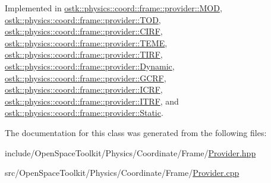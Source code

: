 Implemented in \hyperlink{classostk_1_1physics_1_1coord_1_1frame_1_1provider_1_1_m_o_d_a0b6a40a222857ad032f5d5a8d228ab16}{ostk\+::physics\+::coord\+::frame\+::provider\+::\+M\+OD}, \hyperlink{classostk_1_1physics_1_1coord_1_1frame_1_1provider_1_1_t_o_d_a57f8d993ac693b2cd39b4a99faadc92f}{ostk\+::physics\+::coord\+::frame\+::provider\+::\+T\+OD}, \hyperlink{classostk_1_1physics_1_1coord_1_1frame_1_1provider_1_1_c_i_r_f_affec3924a864a0d793ee5aa887a06cf8}{ostk\+::physics\+::coord\+::frame\+::provider\+::\+C\+I\+RF}, \hyperlink{classostk_1_1physics_1_1coord_1_1frame_1_1provider_1_1_t_e_m_e_a8a1c5599411f152c63b69819e89b0464}{ostk\+::physics\+::coord\+::frame\+::provider\+::\+T\+E\+ME}, \hyperlink{classostk_1_1physics_1_1coord_1_1frame_1_1provider_1_1_t_i_r_f_ac7f3d815a45e270adab07bf6f51dc25f}{ostk\+::physics\+::coord\+::frame\+::provider\+::\+T\+I\+RF}, \hyperlink{classostk_1_1physics_1_1coord_1_1frame_1_1provider_1_1_dynamic_ab01d8d9a09df8e46680eb1acb830a86c}{ostk\+::physics\+::coord\+::frame\+::provider\+::\+Dynamic}, \hyperlink{classostk_1_1physics_1_1coord_1_1frame_1_1provider_1_1_g_c_r_f_a02160b74124b3ece74912c62aae5caaa}{ostk\+::physics\+::coord\+::frame\+::provider\+::\+G\+C\+RF}, \hyperlink{classostk_1_1physics_1_1coord_1_1frame_1_1provider_1_1_i_c_r_f_a0d8e56478597e46dbc2c1867e6774398}{ostk\+::physics\+::coord\+::frame\+::provider\+::\+I\+C\+RF}, \hyperlink{classostk_1_1physics_1_1coord_1_1frame_1_1provider_1_1_i_t_r_f_a2f3a53b002d54f1adf829cefc2cf7393}{ostk\+::physics\+::coord\+::frame\+::provider\+::\+I\+T\+RF}, and \hyperlink{classostk_1_1physics_1_1coord_1_1frame_1_1provider_1_1_static_a5b7189d8cff8128fee348af2feac1304}{ostk\+::physics\+::coord\+::frame\+::provider\+::\+Static}.



The documentation for this class was generated from the following files\+:\begin{DoxyCompactItemize}
\item 
include/\+Open\+Space\+Toolkit/\+Physics/\+Coordinate/\+Frame/\hyperlink{_provider_8hpp}{Provider.\+hpp}\item 
src/\+Open\+Space\+Toolkit/\+Physics/\+Coordinate/\+Frame/\hyperlink{_provider_8cpp}{Provider.\+cpp}\end{DoxyCompactItemize}
